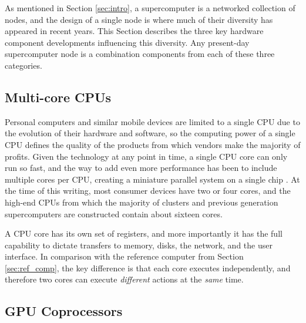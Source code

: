 As mentioned in Section \ref{sec:intro}, a supercomputer is
a networked collection of nodes, and the design of a single node
is where much of their diversity has appeared in recent years.
This Section describes the three key hardware component developments
influencing this diversity.
Any present-day supercomputer node is a combination components
from each of these three categories.

\subsection{Multi-core CPUs}

Personal computers and similar mobile devices are limited
to a single CPU due to the evolution of their hardware and
software, so the computing power of a single CPU defines
the quality of the products from which vendors make
the majority of profits.
Given the technology at any point in time, a single CPU
core can only run so fast, and the way to add even more performance
has been to include multiple cores per CPU,
creating a miniature parallel system on a single chip
\cite{hennessy2011computer}.
At the time of this writing, most consumer devices
have two or four cores, and the high-end CPUs from
which the majority of clusters and previous generation
supercomputers are constructed
contain about sixteen cores.

A CPU core has its own set of registers, and more importantly
it has the full capability to dictate transfers to memory,
disks, the network, and the user interface.
In comparison with the reference computer from Section \ref{sec:ref_comp},
the key difference is that each core executes independently,
and therefore two cores can execute \emph{different} actions
at the \emph{same} time.

\subsection{GPU Coprocessors}
\label{sec:def_gpu}

